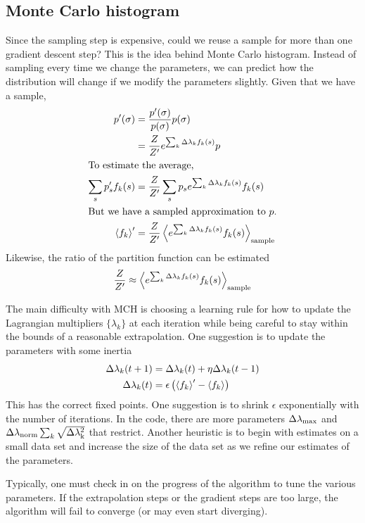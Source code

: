 \documentclass[aps,prl,twocolumn]{revtex4-1}
\begin{document}
\subsection{Monte Carlo histogram}
Since the sampling step is expensive, could we reuse a sample for more than one gradient descent step? This is the idea behind Monte Carlo histogram. Instead of sampling every time we change the parameters, we can predict how the distribution will change if we modify the parameters slightly. Given that we have a sample,
\begin{align}
	p'(\sigma) &= \frac{p'(\sigma)}{p(\sigma)}p(\sigma)\\
		&= \frac{Z}{Z'}e^{\sum_k \Delta\lambda_k f_k(s)} p\\
\intertext{To estimate the average,}
	\sum_s p_s' f_k(s) &= \frac{Z}{Z'} \sum_s p_s e^{\sum_k \Delta\lambda_k f_k(s)} f_k(s)\\
\intertext{But we have a sampled approximation to $p$.}
	\left<f_k\right>' &= \frac{Z}{Z'} \left<e^{\sum_k \Delta\lambda_k f_k(s)} f_k(s)\right>_{\rm sample}
\end{align}
Likewise, the ratio of the partition function can be estimated
\begin{align}
	\frac{Z}{Z'} \approx \left<e^{\sum_k \Delta\lambda_k f_k(s)}f_k(s)\right>_{\rm sample}
\end{align}

The main difficulty with MCH is choosing a learning rule for how to update the Lagrangian multipliers $\{\lambda_k\}$ at each iteration while being careful to stay within the bounds of a reasonable extrapolation. One suggestion is to update the parameters with some inertia
\begin{align}
	\Delta\lambda_k(t+1) &= \Delta \lambda_k(t) + \eta \Delta\lambda_k(t-1)\\
	\Delta \lambda_k(t) &= \epsilon\left(\left<f_k\right>'-\left<f_k\right>\right)
\end{align}
This has the correct fixed points. One suggestion is to shrink $\epsilon$ exponentially with the number of iterations. In the code, there are more parameters $\Delta\lambda_{\rm max}$ and $\Delta\lambda_{\rm norm}\sum_k \sqrt{\Delta\lambda_{\rm k}^2}$ that restrict. Another heuristic is to begin with estimates on a small data set and increase the size of the data set as we refine our estimates of the parameters.

Typically, one must check in on the progress of the algorithm to tune the various parameters. If the extrapolation steps or the gradient steps are too large, the algorithm will fail to converge (or may even start diverging).
\end{document}
